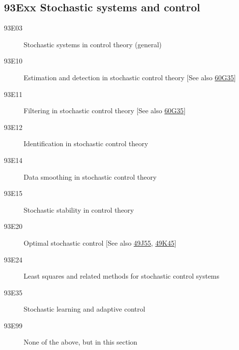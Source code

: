 \subsection*{93Exx  Stochastic systems and control }\label{93Exx}
\begin{description}  
\item [93E03]\label{93E03} Stochastic systems in control theory (general)
\item [93E10]\label{93E10} Estimation and detection in stochastic control theory [See also \hyperref[60G35]{60G35}]
\item [93E11]\label{93E11} Filtering in stochastic control theory [See also \hyperref[60G35]{60G35}]
\item [93E12]\label{93E12} Identification in stochastic control theory
\item [93E14]\label{93E14} Data smoothing in stochastic control theory
\item [93E15]\label{93E15} Stochastic stability in control theory
\item [93E20]\label{93E20} Optimal stochastic control [See also \hyperref[49J55]{49J55}, \hyperref[49K45]{49K45}]
\item [93E24]\label{93E24} Least squares and related methods for stochastic control systems
\item [93E35]\label{93E35} Stochastic learning and adaptive control
\item [93E99]\label{93E99} None of the above, but in this section
\end{description}
